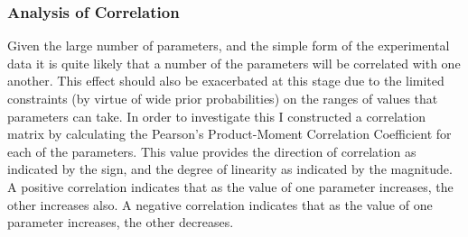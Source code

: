 \subsubsection{Analysis of Correlation}
Given the large number of parameters, and the simple form of the experimental data it is quite likely that a number of the parameters will be correlated with one another. This effect should also be exacerbated at this stage due to the limited constraints (by virtue of wide prior probabilities) on the ranges of values that parameters can take. In order to investigate this I constructed a correlation matrix by calculating the Pearson's Product-Moment Correlation Coefficient for each of the parameters. This value provides the direction of correlation as indicated by the sign, and the degree of linearity as indicated by the magnitude. A positive correlation indicates that as the value of one parameter increases, the other increases also. A negative correlation indicates that as the value of one parameter increases, the other decreases.

